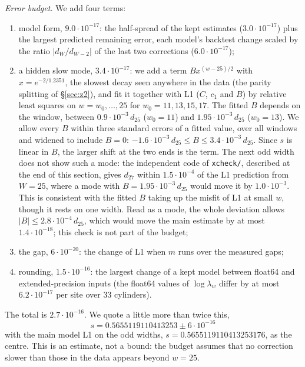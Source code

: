 \documentclass[11pt]{amsart}
\theoremstyle{definition}
\theoremstyle{remark}
\newcommand{\file}[1]{\texttt{#1}}
\begin{document}
\emph{Error budget.} We add four terms:
\begin{enumerate}
\item model form, $9.0\cdot10^{-17}$: the half-spread of the kept estimates ($3.0\cdot10^{-17}$) plus
the largest predicted remaining error, each model's backtest change scaled by the ratio
$|d_W/d_{W-2}|$ of the last two corrections ($6.0\cdot10^{-17}$);
\item a hidden slow mode, $3.4\cdot10^{-17}$: we add a term $B x^{(w-25)/2}$ with
$x = e^{-2/1.2351}$, the slowest decay seen anywhere in the data (the parity splitting of
\S\ref{sec:z2}), and fit it together with L1 ($C$, $c_1$ and $B$) by relative least squares on
$w = w_0, \dots, 25$ for $w_0 = 11, 13, 15, 17$. The fitted $B$ depends on the window, between
$0.9\cdot10^{-3}\,d_{25}$ ($w_0 = 11$) and $1.95\cdot10^{-3}\,d_{25}$ ($w_0 = 13$). We allow every $B$ within three
standard errors of a fitted value, over all windows and widened to include $B = 0$:
$-1.6\cdot10^{-3}\,d_{25} \le B \le 3.4\cdot10^{-3}\,d_{25}$. Since $s$ is linear in $B$, the larger shift at
the two ends is the term. The next odd width does not show such a mode: the independent code of
\file{xcheck/}, described at the end of this section, gives $d_{27}$ within $1.5\cdot10^{-4}$ of the L1 prediction from $W = 25$, where a mode
with $B = 1.95\cdot10^{-3}\,d_{25}$ would move it by $1.0\cdot10^{-3}$. This is consistent with the fitted $B$
taking up the misfit of L1 at small $w$, though it rests on one width. Read as a mode, the whole
deviation allows $|B| \le 2.8\cdot10^{-4}\,d_{25}$, which would move the main estimate by at most
$1.4\cdot10^{-18}$; this check is not part of the budget;
\item the gap, $6\cdot10^{-20}$: the change of L1 when $m$ runs over the measured gaps;
\item rounding, $1.5\cdot10^{-16}$: the largest change of a kept model between float64 and
extended-precision inputs (the float64 values of $\log\lambda_w$ differ by at most $6.2\cdot10^{-17}$
per site over $33$ cylinders).
\end{enumerate}
The total is $2.7\cdot10^{-16}$. We quote a little more than twice this,
\[
  \boxed{\,s = 0.5655119110413253 \pm 6\cdot10^{-16}\,}
\]
with the main model L1 on the odd widths, $s = 0.5655119110413253176$, as the centre. This is an
estimate, not a bound: the budget assumes that no correction slower than those in the data
appears beyond $w = 25$.
\end{document}
